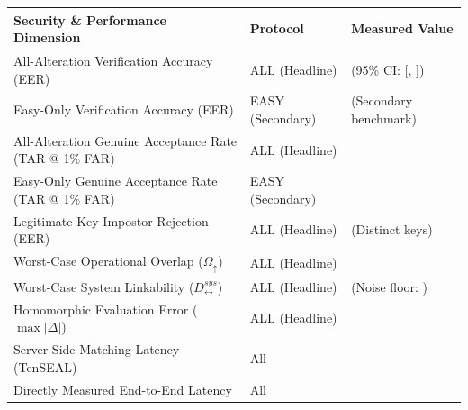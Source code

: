\begin{tabular}{lll}
\toprule
\textbf{Security \& Performance Dimension} & \textbf{Protocol} & \textbf{Measured Value} \\
\midrule
All-Alteration Verification Accuracy (EER) & ALL (Headline) & \AllAlterationEER{} (95\% CI: [\AllAlterationEERCILow{}, \AllAlterationEERCIHigh{}]) \\
Easy-Only Verification Accuracy (EER) & EASY (Secondary) & \EasyOnlyEER{} (Secondary benchmark) \\
All-Alteration Genuine Acceptance Rate (TAR @ 1\% FAR) & ALL (Headline) & \AllAlterationTAROne{} \\
Easy-Only Genuine Acceptance Rate (TAR @ 1\% FAR) & EASY (Secondary) & \EasyOnlyTAROne{} \\
Legitimate-Key Impostor Rejection (EER) & ALL (Headline) & \LegitEER{} (Distinct keys) \\
Worst-Case Operational Overlap ($\Omega_{\uparrow}$) & ALL (Headline) & \ROPWorstOmega{} \\
Worst-Case System Linkability ($D_{\leftrightarrow}^{\mathit{sys}}$) & ALL (Headline) & \ROPWorstDsys{} (Noise floor: \NullNoiseFloorP{}) \\
Homomorphic Evaluation Error ($\max |\Delta|$) & ALL (Headline) & \CKKSMaxAbsErr{} \\
Server-Side Matching Latency (TenSEAL) & All & \ServerDotMedian{} \\
Directly Measured End-to-End Latency & All & \EETOMedian{} \\
\bottomrule
\end{tabular}